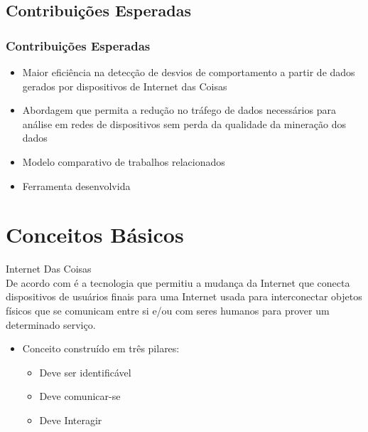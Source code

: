 \documentclass[hyperref={pdfpagelabels=false}]{beamer}
\begin{document}
\subsection{Contribuições Esperadas}  

\begin{frame}
	\frametitle{Contribuições Esperadas}
	\begin{itemize}
		\item Maior eficiência na detecção de desvios de comportamento a partir de dados gerados por dispositivos de Internet das Coisas
        \item Abordagem que permita a redução no tráfego de dados necessários para análise em redes de dispositivos sem perda da qualidade da mineração dos dados 
        \item Modelo comparativo de trabalhos relacionados
        \item Ferramenta desenvolvida 
	\end{itemize}
\end{frame}
   
\section{Conceitos Básicos}

\begin{frame}
    
    \Large{Internet Das Coisas} \\
    
    \normalsize{De acordo com \cite{000-004}} é a tecnologia que permitiu a mudança da Internet que conecta dispositivos de usuários finais para uma Internet usada para interconectar objetos físicos que se comunicam entre si e/ou com seres humanos para prover um determinado serviço.
    \begin{itemize}
	    \item \normalsize{Conceito construído em três pilares:} \begin{itemize}
		    \item Deve ser identificável
            \item Deve comunicar-se
            \item Deve Interagir
		    \end{itemize}
        
    \end{itemize}

\end{frame}
\end{document}
